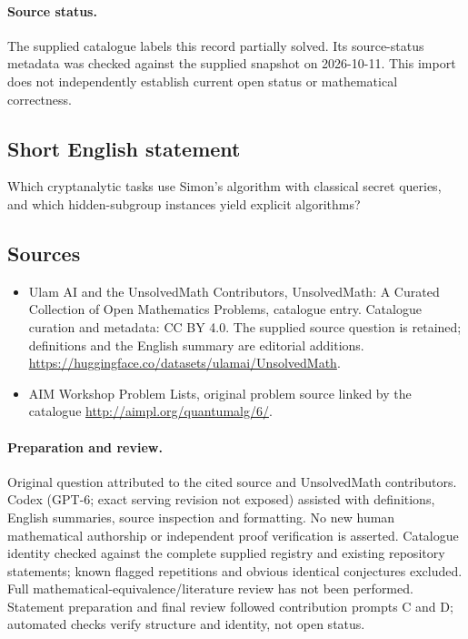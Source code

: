 \documentclass[11pt]{article}
\begin{document}
\paragraph{Source status.}
The supplied catalogue labels this record partially solved. Its source-status metadata was checked against the supplied snapshot on 2026-10-11. This import does not independently establish current open status or mathematical correctness.
\subsection{Short English statement}
Which cryptanalytic tasks use Simon's algorithm with classical secret queries, and which hidden-subgroup instances yield explicit algorithms?
\subsection{Sources}
\begin{itemize}
\item[\hypertarget{source:statement:1}{S1}] Ulam AI and the UnsolvedMath Contributors, UnsolvedMath: A Curated Collection of Open Mathematics Problems, catalogue entry. Catalogue curation and metadata: CC BY 4.0. The supplied source question is retained; definitions and the English summary are editorial additions.
\url{https://huggingface.co/datasets/ulamai/UnsolvedMath}.
\item[\hypertarget{source:statement:2}{S2}] AIM Workshop Problem Lists, original problem source linked by the catalogue
\url{http://aimpl.org/quantumalg/6/}.
\end{itemize}
\paragraph{Preparation and review.}
Original question attributed to the cited source and UnsolvedMath contributors. Codex (GPT-6; exact serving revision not exposed) assisted with definitions, English summaries, source inspection and formatting. No new human mathematical authorship or independent proof verification is asserted. Catalogue identity checked against the complete supplied registry and existing repository statements; known flagged repetitions and obvious identical conjectures excluded. Full mathematical-equivalence/literature review has not been performed. Statement preparation and final review followed contribution prompts C and D; automated checks verify structure and identity, not open status.
\label{end:statement}
\end{document}
